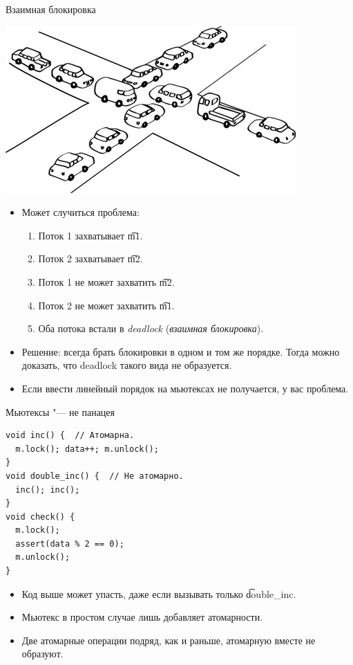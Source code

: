 \begin{frame}{Взаимная блокировка}
	\begin{center}
		\includegraphics{deadlock.jpg}
	\end{center}
	\begin{itemize}
		\item
			Может случиться проблема:
			\begin{enumerate}
				\item Поток 1 захватывает \t{m1}.
				\item Поток 2 захватывает \t{m2}.
				\item Поток 1 не может захватить \t{m2}.
				\item Поток 2 не может захватить \t{m1}.
				\item Оба потока встали в \textit{deadlock} (\textit{взаимная блокировка}).
			\end{enumerate}
		\item
			Решение: всегда брать блокировки в одном и том же порядке.
			Тогда можно доказать, что deadlock такого вида не образуется.
		\item
			Если ввести линейный порядок на мьютексах не получается, у вас проблема.
	\end{itemize}
\end{frame}

\begin{frame}[fragile]{Мьютексы "--- не панацея}
\begin{verbatim}
void inc() {  // Атомарна.
  m.lock(); data++; m.unlock();
}
void double_inc() {  // Не атомарно.
  inc(); inc();
}
void check() {
  m.lock();
  assert(data % 2 == 0);
  m.unlock();
}
\end{verbatim}
	\begin{itemize}
		\item Код выше может упасть, даже если вызывать только \t{double\_inc}.
		\item Мьютекс в простом случае лишь добавляет атомарности.
		\item Две атомарные операции подряд, как и раньше, атомарную вместе не образуют.
	\end{itemize}
\end{frame}

